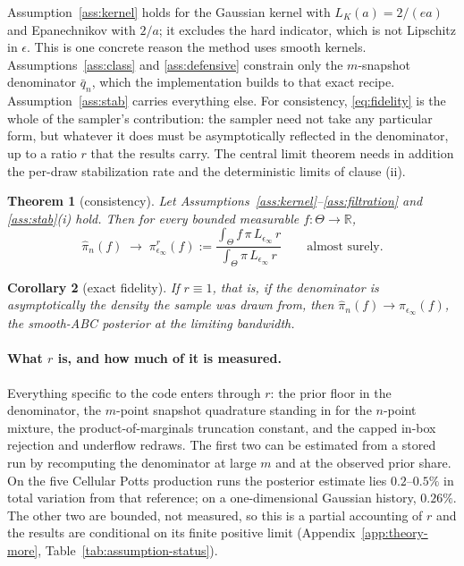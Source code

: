 \documentclass[pdflatex,sn-mathphys-num]{sn-jnl}
\theoremstyle{plain}
\newtheorem{theorem}{Theorem}
\newtheorem{corollary}[theorem]{Corollary}
\theoremstyle{definition}
\begin{document}
Assumption~\ref{ass:kernel} holds for the Gaussian kernel with $L_K(a)=2/(ea)$ and Epanechnikov with $2/a$; it excludes the hard indicator, which is not Lipschitz in $\epsilon$. This is one concrete reason the method uses smooth kernels. Assumptions~\ref{ass:class} and \ref{ass:defensive} constrain only the $m$-snapshot denominator $\bar q_n$, which the implementation builds to that exact recipe. Assumption~\ref{ass:stab} carries everything else. For consistency, \eqref{eq:fidelity} is the whole of the sampler's contribution: the sampler need not take any particular form, but whatever it does must be asymptotically reflected in the denominator, up to a ratio $r$ that the results carry. The central limit theorem needs in addition the per-draw stabilization rate and the deterministic limits of clause (ii).

\begin{theorem}[consistency]\label{thm:consistency}
Let Assumptions~\ref{ass:kernel}--\ref{ass:filtration} and \ref{ass:stab}(i) hold. Then for every bounded measurable $f:\Theta\to\mathbb{R}$,
\begin{equation}
\widehat\pi_n(f)\;\longrightarrow\;\pi^{r}_{\epsilon_\infty}(f):=\frac{\int_\Theta f\,\pi\,L_{\epsilon_\infty}\,r}{\int_\Theta \pi\,L_{\epsilon_\infty}\,r}
\qquad\text{almost surely.}
\label{eq:tilted-target}
\end{equation}
\end{theorem}

\begin{corollary}[exact fidelity]\label{cor:exact}
If $r\equiv1$, that is, if the denominator is asymptotically the density the sample was drawn from, then $\widehat\pi_n(f)\to\pi_{\epsilon_\infty}(f)$, the smooth-ABC posterior at the limiting bandwidth.
\end{corollary}


\paragraph{What $r$ is, and how much of it is measured.} Everything specific to the code enters through $r$: the prior floor in the denominator, the $m$-point snapshot quadrature standing in for the $n$-point mixture, the product-of-marginals truncation constant, and the capped in-box rejection and underflow redraws. The first two can be estimated from a stored run by recomputing the denominator at large $m$ and at the observed prior share. On the five Cellular Potts production runs the posterior estimate lies $0.2$--$0.5\%$ in total variation from that reference; on a one-dimensional Gaussian history, $0.26\%$. The other two are bounded, not measured, so this is a partial accounting of $r$ and the results are conditional on its finite positive limit (Appendix~\ref{app:theory-more}, Table~\ref{tab:assumption-status}).
\end{document}
